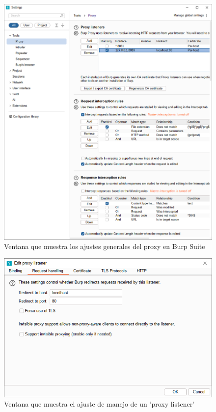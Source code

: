 \documentclass[letterpaper,12pt]{article}
\begin{document}
\begin{figure}
    \centering
    \includegraphics[width=1\linewidth]{levanteyredireccione/Captura desde 2025-10-01 23-12-48.png}
    \caption{Ventana que muestra los ajustes generales del proxy en Burp Suite}
    \label{fig:proxygeneralsetting}
\end{figure}
\begin{figure}
    \centering
    \includegraphics[width=1\linewidth]{levanteyredireccione/Captura desde 2025-10-01 23-12-53.png}
    \caption{Ventana que muestra el ajuste de manejo de un 'proxy listener'}
    \label{fig:proxylistener}
\end{figure}
\end{document}

